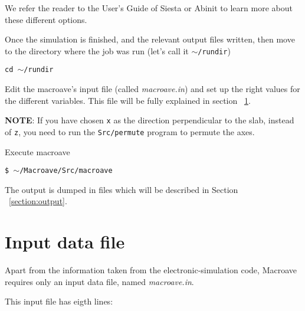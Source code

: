  We refer the reader to the User's Guide of {\sc Siesta} or {\sc Abinit}
 to learn more about these different options. 

 Once the simulation is finished, and the relevant output files
 written, then move to the directory where the job was run (let's call it
 {\tt $\sim$/rundir})

 {\tt cd $\sim$/rundir} 
 

 Edit the {\sc macroave}'s input file (called {\it macroave.in})
 and set up the right values for the different variables. This
 file will be fully explained in section ~\ref{section:input}.

 {\bf NOTE}: If you have chosen {\tt x} as the direction perpendicular to
 the slab, instead of {\tt z}, you need to run the {\tt Src/permute}
 program to permute the axes.

 Execute macroave

 {\tt \$ $\sim$/Macroave/Src/macroave } 

 The output is dumped in files which will be described
 in Section ~\ref{section:output}.

\section{Input data file}
\label{section:input}

 Apart from the information taken from the electronic-simulation 
 code, {\sc Macroave} requires only an input data file, 
 named {\it macroave.in}. 

 This input file has eigth lines:

